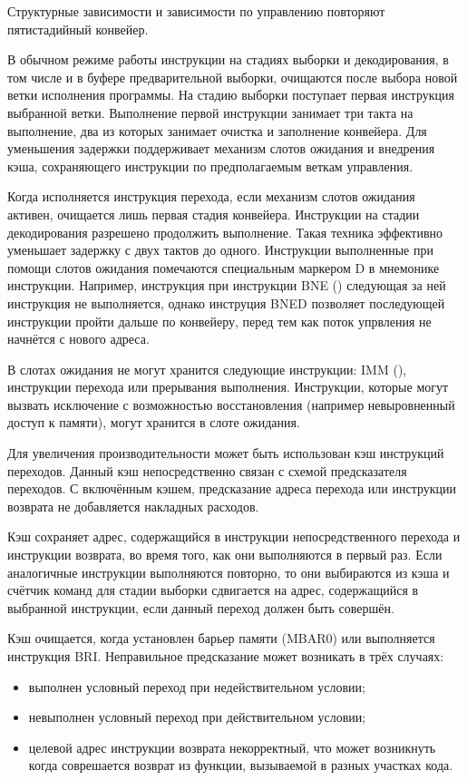 Структурные зависимости и зависимости по управлению повторяют пятистадийный конвейер.

В обычном режиме работы инструкции на стадиях выборки и декодирования, в том числе и
в буфере предварительной выборки, очищаются после выбора новой ветки исполнения программы.
На стадию выборки поступает первая инструкция выбранной ветки. Выполнение первой инструкции
занимает три такта на выполнение, два из которых занимает очистка и заполнение конвейера.
Для уменьшения задержки  поддерживает механизм слотов ожидания и внедрения
кэша, сохраняющего инструкции по предполагаемым веткам управления.

Когда исполняется инструкция перехода, если механизм слотов ожидания активен, очищается
лишь первая стадия конвейера. Инструкции на стадии декодирования разрешено продолжить
выполнение. Такая техника эффективно уменьшает задержку с двух тактов до одного. Инструкции
выполненные при помощи слотов ожидания помечаются специальным маркером D в мнемонике инструкции.
Например, инструкция при инструкции BNE () следующая за ней инструкция не
выполняется, однако инструция BNED позволяет последующей инструкции пройти дальше по конвейеру, перед
тем как поток упрвления не начнётся с нового адреса.

В слотах ожидания не могут хранится следующие инструкции: IMM (),
инструкции перехода или прерывания выполнения. Инструкции, которые могут вызвать
исключение с возможностью восстановления (например невыровненный доступ к памяти),
могут хранится в слоте ожидания.

Для увеличения производительности может быть использован кэш инструкций переходов.
Данный кэш непосредственно связан с схемой предсказателя переходов. С включённым кэшем,
предсказание адреса перехода или инструкции возврата не добавляется накладных
расходов.

Кэш сохраняет адрес, содержащийся в инструкции непосредственного перехода и инструкции
возврата, во время того, как они выполняются в первый раз. Если аналогичные инструкции
выполняются повторно, то они выбираются из кэша и счётчик команд для стадии выборки сдвигается
на адрес, содержащийся в выбранной инструкции, если данный переход должен быть совершён.

Кэш очищается, когда установлен барьер памяти (MBAR0) или выполняется инструкция BRI.
Неправильное предсказание может возникать в трёх случаях:
\begin{itemize}
   \item выполнен условный переход при недействительном условии;
   \item невыполнен условный переход при действительном условии;
   \item целевой адрес инструкции возврата некорректный, что
     может возникнуть когда соврешается возврат из функции, вызываемой
     в разных участках кода.
\end{itemize}

